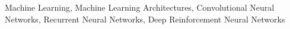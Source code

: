 \begin{center}
\begin{IEEEkeywords}
Machine Learning, Machine Learning Architectures, Convolutional Neural Networks, Recurrent Neural Networks, Deep Reinforcement Neural Networks
\end{IEEEkeywords}
\end{center}